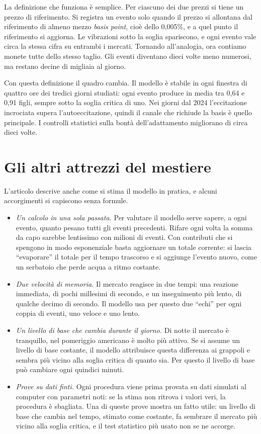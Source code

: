 \documentclass[a4paper,11pt]{article}
\begin{document}
La definizione che funziona è semplice. Per ciascuno dei due prezzi si tiene un prezzo di riferimento. Si registra un evento solo quando il prezzo si allontana dal riferimento di almeno mezzo \emph{basis point}, cioè dello 0,005\%, e a quel punto il riferimento si aggiorna. Le vibrazioni sotto la soglia spariscono, e ogni evento vale circa la stessa cifra su entrambi i mercati. Tornando all'analogia, ora contiamo monete tutte dello stesso taglio. Gli eventi diventano dieci volte meno numerosi, ma restano decine di migliaia al giorno.

Con questa definizione il quadro cambia. Il modello è stabile in ogni finestra di quattro ore dei tredici giorni studiati: ogni evento produce in media tra 0,64 e 0,91 figli, sempre sotto la soglia critica di uno. Nei giorni dal 2024 l'eccitazione incrociata supera l'autoeccitazione, quindi il canale che richiude la basis è quello principale. I controlli statistici sulla bontà dell'adattamento migliorano di circa dieci volte.

\section*{Gli altri attrezzi del mestiere}

L'articolo descrive anche come si stima il modello in pratica, e alcuni accorgimenti si capiscono senza formule.

\begin{itemize}
\item \emph{Un calcolo in una sola passata.} Per valutare il modello serve sapere, a ogni evento, quanto pesano tutti gli eventi precedenti. Rifare ogni volta la somma da capo sarebbe lentissimo con milioni di eventi. Con contributi che si spengono in modo esponenziale basta aggiornare un totale corrente: si lascia ``evaporare'' il totale per il tempo trascorso e si aggiunge l'evento nuovo, come un serbatoio che perde acqua a ritmo costante.
\item \emph{Due velocità di memoria.} Il mercato reagisce in due tempi: una reazione immediata, di pochi millesimi di secondo, e un inseguimento più lento, di qualche decimo di secondo. Il modello usa per questo due ``echi'' per ogni coppia di eventi, uno veloce e uno lento.
\item \emph{Un livello di base che cambia durante il giorno.} Di notte il mercato è tranquillo, nel pomeriggio americano è molto più attivo. Se si assume un livello di base costante, il modello attribuisce questa differenza ai grappoli e sembra più vicino alla soglia critica di quanto sia. Per questo il livello di base può cambiare ogni quindici minuti.
\item \emph{Prove su dati finti.} Ogni procedura viene prima provata su dati simulati al computer con parametri noti: se la stima non ritrova i valori veri, la procedura è sbagliata. Una di queste prove mostra un fatto utile: un livello di base che cambia nel tempo, stimato come costante, fa sembrare il mercato più vicino alla soglia critica, e il test statistico più usato non se ne accorge.
\end{itemize}
\end{document}
